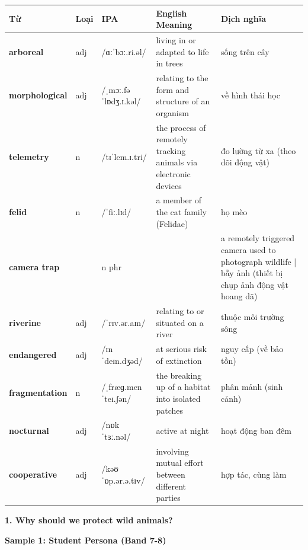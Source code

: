 \vspace{0.8em}
\begin{center}
\renewcommand{\arraystretch}{1.65}
\begin{tabularx}{\textwidth}{|V{0.22\textwidth}|C{0.07\textwidth}|I{0.20\textwidth}|Y|V{0.18\textwidth}|}
\hline
{}
\textbf{Từ} & \textbf{Loại} & \textbf{IPA} & \textbf{English Meaning} & \textbf{Dịch nghĩa} \\
\hline
\textbf{arboreal} & adj & /ɑːˈbɔː.ri.əl/ & living in or adapted to life in trees & sống trên cây \\ \hline
\textbf{morphological} & adj & /ˌmɔː.fəˈlɒdʒ.ɪ.kəl/ & relating to the form and structure of an organism & về hình thái học \\ \hline
\textbf{telemetry} & n & /tɪˈlem.ɪ.tri/ & the process of remotely tracking animals via electronic devices & đo lường từ xa (theo dõi động vật) \\ \hline
\textbf{felid} & n & /ˈfiː.lɪd/ & a member of the cat family (Felidae) & họ mèo \\ \hline
\textbf{camera trap} & & n phr & & a remotely triggered camera used to photograph wildlife | bẫy ảnh (thiết bị chụp ảnh động vật hoang dã) \\ \hline
\textbf{riverine} & adj & /ˈrɪv.ər.aɪn/ & relating to or situated on a river & thuộc môi trường sông \\ \hline
\textbf{endangered} & adj & /ɪnˈdeɪn.dʒəd/ & at serious risk of extinction & nguy cấp (về bảo tồn) \\ \hline
\textbf{fragmentation} & n & /ˌfræɡ.menˈteɪ.ʃən/ & the breaking up of a habitat into isolated patches & phân mảnh (sinh cảnh) \\ \hline
\textbf{nocturnal} & adj & /nɒkˈtɜː.nəl/ & active at night & hoạt động ban đêm \\ \hline
\textbf{cooperative} & adj & /kəʊˈɒp.ər.ə.tɪv/ & involving mutual effort between different parties & hợp tác, cùng làm \\ \hline
\end{tabularx}
\end{center}

\partthreeheader

\begin{ieltsquestion}
\textbf{1. Why should we protect wild animals?}
\end{ieltsquestion}
\textbf{Sample 1: Student Persona (Band 7-8)}

